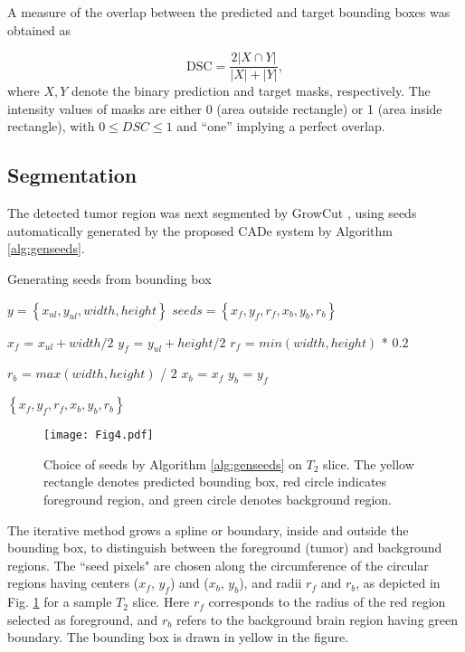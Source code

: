 \documentclass[journal,twocolumn]{IEEEtran}
\begin{document}
 A measure of the overlap between the  predicted  and  target bounding boxes was obtained as

\begin{equation}
	\text{DSC} = \frac{2|X \cap Y|}{|X| + |Y|},
\label{eq:dsc}
\end{equation}
where $X, Y$ denote the binary prediction and target masks, respectively.
 The intensity values of masks are either 0 (area outside rectangle) or 1 (area inside rectangle),
   with $0 \leq DSC \leq 1 $  and ``one'' implying a perfect overlap.

\subsection{Segmentation}
The detected tumor region was next segmented by GrowCut \cite{Vezhnevets2005_growcut}, using seeds automatically generated by the
proposed CADe system by Algorithm \ref{alg:genseeds}.

\begin{algorithm}
	\small
	\flushleft
	\caption{Generating  seeds from bounding box}
	\begin{algorithmic}[1]
		\renewcommand{\algorithmicrequire}{\textbf{Input:}}
		\renewcommand{\algorithmicensure}{\textbf{Output:}}
		\REQUIRE $y = \left\lbrace x_{ul}, y_{ul}, width, height\right\rbrace $
		\ENSURE  $seeds =\left\lbrace x_f,y_f, r_f, x_b, y_b, r_b  \right\rbrace$
	
		\STATE $x_f$ = $x_{ul} + width/2$
		\STATE $y_f$ = $y_{ul} + height/2$
		\STATE $r_f$ =  $min(width, height)$ * $0.2$
		
		\STATE $r_b$ = $max(width, height)$ / $2$
		\STATE $x_b$ = $x_f$
		\STATE $y_b$ = $y_f$
		
		\RETURN $\left\lbrace x_f,y_f, r_f, x_b, y_b, r_b  \right\rbrace$
		
	\end{algorithmic}
	\label{alg:genseeds}
\end{algorithm}


\begin{figure}
	\centering
	\texttt{[image: Fig4.pdf]}
	\caption{Choice of seeds  by Algorithm \ref{alg:genseeds} on $T_2$ slice. The yellow rectangle denotes predicted bounding box, red circle indicates
 foreground region, and green circle denotes  background region.}
 	\label{fig:seedIllustration}
\end{figure}

The iterative method grows a spline or boundary, inside and outside the bounding box,  to distinguish between the foreground (tumor) and background regions. The ``seed pixels" are chosen  along the circumference of the circular regions having centers ($x_f$, $y_f$) and ($x_b$, $y_b$), and radii $r_f$ and $r_b$,  as depicted in Fig. \ref{fig:seedIllustration} for a sample $T_2$ slice. Here $r_f$ corresponds to the radius of the red region  selected as  foreground, and $r_b$ refers  to the background  brain region having green boundary. The bounding box is  drawn in yellow in the figure.
\end{document}
